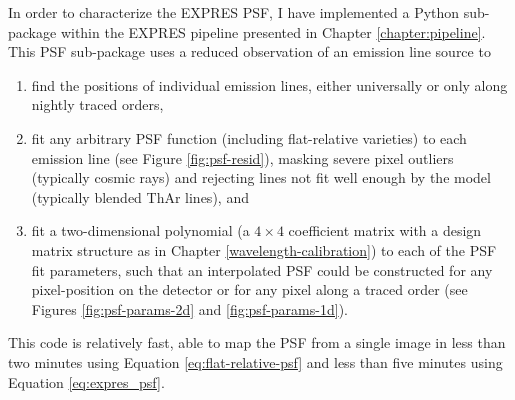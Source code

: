 In order to characterize the EXPRES PSF, I have implemented a Python sub-package within the EXPRES pipeline presented in Chapter \ref{chapter:pipeline}. This PSF sub-package uses a reduced observation of an emission line source to
\begin{enumerate}
    \item find the positions of individual emission lines, either universally or only along night\-ly traced orders,
    \item fit any arbitrary PSF function (including flat-relative varieties) to each emission line (see Figure \ref{fig:psf-resid}), masking severe pixel outliers (typically cosmic rays) and rejecting lines not fit well enough by the model (typically blended ThAr lines), and
    \item fit a two-dimensional polynomial (a $4 \times 4$ coefficient matrix with a design matrix structure as in Chapter \ref{wavelength-calibration}) to each of the PSF fit parameters, such that an interpolated PSF could be constructed for any pixel-position on the detector or for any pixel along a traced order (see Figures \ref{fig:psf-params-2d} and \ref{fig:psf-params-1d}).
\end{enumerate}
This code is relatively fast, able to map the PSF from a single image in less than two minutes using Equation \ref{eq:flat-relative-psf} and less than five minutes using Equation \ref{eq:expres_psf}.

